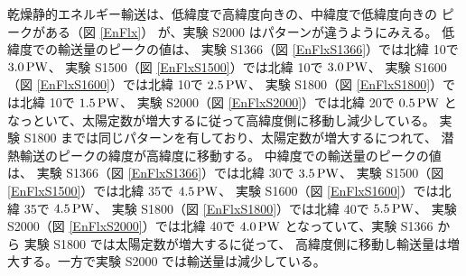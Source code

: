 \documentclass[body]{subfiles}
\begin{document}
乾燥静的エネルギー輸送は、低緯度で高緯度向きの、中緯度で低緯度向きの
ピークがある（図 \ref{EnFlx}）
が、実験 S2000 はパターンが違うようにみえる。
低緯度での輸送量のピークの値は、
実験 S1366（図 \ref{EnFlxS1366}）では北緯 10\textdegree で \(3.0\hmu{PW}\)、
実験 S1500（図 \ref{EnFlxS1500}）では北緯 10\textdegree で \(3.0\hmu{PW}\)、
実験 S1600（図 \ref{EnFlxS1600}）では北緯 10\textdegree で \(2.5\hmu{PW}\)、
実験 S1800（図 \ref{EnFlxS1800}）では北緯 10\textdegree で \(1.5\hmu{PW}\)、
実験 S2000（図 \ref{EnFlxS2000}）では北緯 20\textdegree で \(0.5\hmu{PW}\)
となっといて、太陽定数が増大するに従って高緯度側に移動し減少している。
実験 S1800 までは同じパターンを有しており、太陽定数が増大するにつれて、
潜熱輸送のピークの緯度が高緯度に移動する。
中緯度での輸送量のピークの値は、
実験 S1366（図 \ref{EnFlxS1366}）では北緯 30\textdegree で \(3.5\hmu{PW}\)、
実験 S1500（図 \ref{EnFlxS1500}）では北緯 35\textdegree で \(4.5\hmu{PW}\)、
実験 S1600（図 \ref{EnFlxS1600}）では北緯 35\textdegree で \(4.5\hmu{PW}\)、
実験 S1800（図 \ref{EnFlxS1800}）では北緯 40\textdegree で \(5.5\hmu{PW}\)、
実験 S2000（図 \ref{EnFlxS2000}）では北緯 40\textdegree で \(4.0\hmu{PW}\)
となっていて、実験 S1366 から 実験 S1800 では太陽定数が増大するに従って、
高緯度側に移動し輸送量は増大する。一方で実験 S2000 では輸送量は減少している。

\afterpage{\clearpage}
\end{document}
